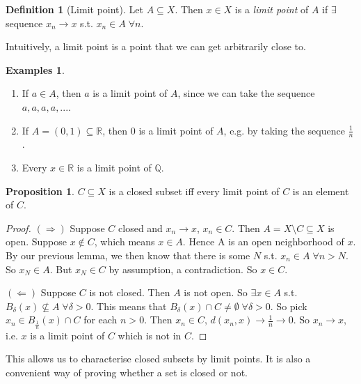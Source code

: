 \documentclass[a4paper,11pt]{article}
\theoremstyle{definition}
\newtheorem*{defn}{Definition}
\newtheorem*{prop}{Proposition}
\newtheorem*{exs}{Examples}
\numberwithin{equation}{section}
\begin{document}
\begin{defn}[Limit point]
Let $A\subseteq X$. Then $x\in X$ is a \emph{limit point} of $A$ if $\exists$ sequence $x_n\rightarrow x$ s.t. $x_n\in A\;\forall n$.

Intuitively, a limit point is a point that we can get arbitrarily close to.
\end{defn}

\begin{exs}
\leavevmode
\begin{enumerate}
    \item If $a\in A$, then $a$ is a limit point of $A$, since we can take the sequence $a,a,a,a,...$.
    \item If $A=(0,1)\subseteq\mathbb{R}$, then $0$ is a limit point of $A$, e.g. by taking the sequence $\frac{1}{n}$.
    \item Every $x\in\mathbb{R}$ is a limit point of $\mathbb{Q}$.
\end{enumerate}
\end{exs}

\begin{prop}
$C\subseteq X$ is a closed subset iff every limit point of $C$ is an element of $C$.
\end{prop}
\begin{proof}
$(\Rightarrow)$ Suppose $C$ closed and $x_n\rightarrow x$, $x_n\in C$. Then $A = X\setminus C \subseteq X$ is open. Suppose $x\notin C$, which means $x\in A$. Hence A is an open neighborhood of $x$. By our previous lemma, we then know that there is some $N$ s.t. $x_n\in A\;\forall n>N$. So $x_N\in A$. But $x_N\in C$ by assumption, a contradiction. So $x\in C$.

$(\Leftarrow)$ Suppose $C$ is not closed. Then $A$ is not open. So $\exists x\in A$ s.t. $B_\delta(x)\nsubseteq A\;\forall \delta>0$. This means that $B_\delta(x)\cap C\neq\emptyset\;\forall\delta >0$. So pick $x_n\in B_{\frac{1}{n}}(x)\cap C$ for each $n>0$. Then $x_n\in C$, $d(x_n,x)\rightarrow\frac{1}{n}\rightarrow0$. So $x_n\rightarrow x$, i.e. $x$ is a limit point of $C$ which is not in $C$.
\end{proof}

This allows us to characterise closed subsets by limit points. It is also a convenient way of proving whether a set is closed or not.
\end{document}
